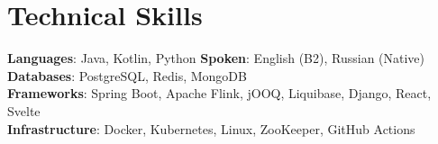 \section{Technical Skills}
 \begin{itemize}[leftmargin=0.15in, label={}]
    \small{\item{
     \textbf{Languages}{: Java, Kotlin, Python} \hfill \textbf{Spoken}{: English (B2), Russian (Native)} \\
     \textbf{Databases}{: PostgreSQL, Redis, MongoDB} \\
     \textbf{Frameworks}{: Spring Boot, Apache Flink, jOOQ, Liquibase, Django, React, Svelte} \\
     \textbf{Infrastructure}{: Docker, Kubernetes, Linux, ZooKeeper, GitHub Actions} \\
    }}
 \end{itemize}